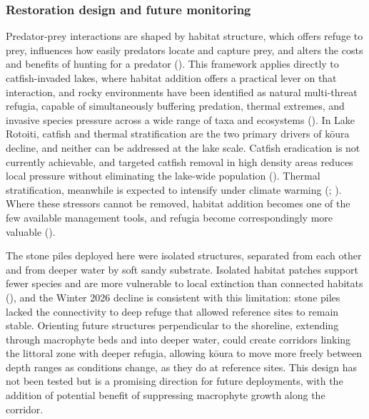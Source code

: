 \documentclass[
  letterpaper,
  DIV=11,
  numbers=noendperiod]{scrartcl}
\begin{document}
\subsubsection{Restoration design and future
monitoring}\label{restoration-design-and-future-monitoring}

Predator-prey interactions are shaped by habitat structure, which offers
refuge to prey, influences how easily predators locate and capture prey,
and alters the costs and benefits of hunting for a predator
(). This framework applies
directly to catfish-invaded lakes, where habitat addition offers a
practical lever on that interaction, and rocky environments have been
identified as natural multi-threat refugia, capable of simultaneously
buffering predation, thermal extremes, and invasive species pressure
across a wide range of taxa and ecosystems
(). In Lake Rotoiti,
catfish and thermal stratification are the two primary drivers of kōura
decline, and neither can be addressed at the lake scale. Catfish
eradication is not currently achievable, and targeted catfish removal in
high density areas reduces local pressure without eliminating the
lake-wide population (). Thermal
stratification, meanwhile is expected to intensify under climate warming
(;
). Where these stressors cannot
be removed, habitat addition becomes one of the few available management
tools, and refugia become correspondingly more valuable
().

The stone piles deployed here were isolated structures, separated from
each other and from deeper water by soft sandy substrate. Isolated
habitat patches support fewer species and are more vulnerable to local
extinction than connected habitats (), and the Winter 2026 decline is consistent with this limitation:
stone piles lacked the connectivity to deep refuge that allowed
reference sites to remain stable. Orienting future structures
perpendicular to the shoreline, extending through macrophyte beds and
into deeper water, could create corridors linking the littoral zone with
deeper refugia, allowing kōura to move more freely between depth ranges
as conditions change, as they do at reference sites. This design has not
been tested but is a promising direction for future deployments, with
the addition of potential benefit of suppressing macrophyte growth along
the corridor.
\end{document}
